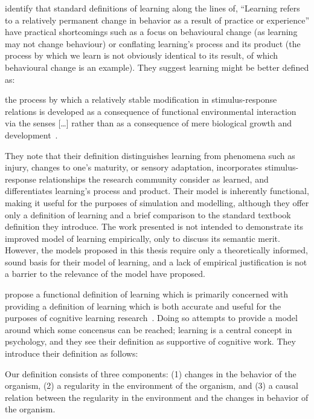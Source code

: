 \citeauthor{lachman1997learning} identify\cite{lachman1997learning} that
standard definitions of learning along the lines of, ``Learning refers to a
relatively permanent change in behavior as a result of practice or experience''
have practical shortcomings such as a focus on behavioural change (as learning
may not change behaviour) or conflating learning's process and its product (the
process by which we learn is not obviously identical to its result, of which
behavioural change is an example). They suggest learning might be better defined
as:

\begin{displayquote}
[\ldots{}] the process by which a relatively stable modification in
stimulus-response relations is developed as a consequence of functional
environmental interaction via the senses [\ldots{}] rather than as a consequence
of mere biological growth and development~\cite{lachman1997learning}.
\end{displayquote}

They note that their definition distinguishes learning from phenomena such as
injury, changes to one's maturity, or sensory adaptation, incorporates
stimulus-response relationships the research community consider as learned, and
differentiates learning's process and product. Their model is inherently
functional, making it useful for the purposes of simulation and modelling,
although they offer only a definition of learning and a brief comparison to
the standard textbook definition they introduce. The work presented is not
intended to demonstrate its improved model of learning empirically, only to
discuss its semantic merit. However, the models proposed in this thesis require
only a theoretically informed, sound basis for their model of learning, and a
lack of empirical justification is not a barrier to the relevance of the model
\citeauthor{lachman1997learning} have proposed.

\citeauthor{de2013learning} propose a functional definition of learning which is
primarily concerned with providing a definition of learning which is both
accurate and useful for the purposes of cognitive learning
research~\cite{de2013learning}. Doing so attempts to provide a model around
which some concensus can be reached; learning is a central concept in
psychology, and they see their definition as supportive of cognitive work. They
introduce their definition as follows:

\begin{displayquote}
Our definition consists of three components: (1) changes in the behavior of the
organism, (2) a regularity in the environment of the organism, and (3) a causal
relation between the regularity in the environment and the changes in behavior
of the organism.
\end{displayquote}

